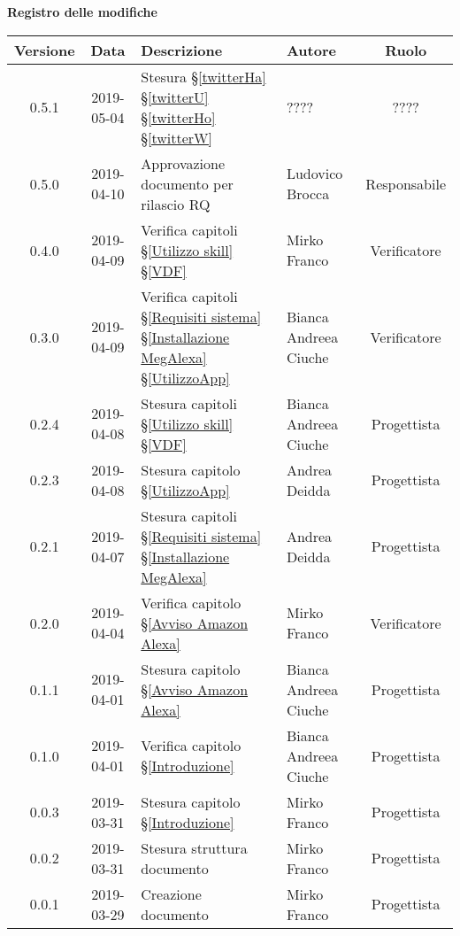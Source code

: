 	\begin{center}
		\textbf{Registro delle modifiche}
	\end{center}
	\begin{center}
		\begin{tabularx}{\textwidth}{|c|c|X|X|c|}
			\hline
			\textbf{Versione} & \textbf{Data} & \textbf{Descrizione} & \textbf{Autore} & \textbf{Ruolo} \\
			\hline
			0.5.1 & 2019-05-04& Stesura \S\ref{twitterHa} \S\ref{twitterU} \S\ref{twitterHo} \S\ref{twitterW} & ???? & ???? \\
			\hline
			0.5.0 & 2019-04-10& Approvazione documento per rilascio RQ & Ludovico Brocca & Responsabile \\
			\hline
			0.4.0 & 2019-04-09& Verifica capitoli \S\ref{Utilizzo skill}  \S\ref{VDF}  & Mirko Franco & Verificatore \\
			\hline
			0.3.0 & 2019-04-09 & Verifica capitoli \S\ref{Requisiti sistema}  \S\ref{Installazione MegAlexa}  \S\ref{UtilizzoApp}  & Bianca Andreea Ciuche & Verificatore \\
			\hline
			0.2.4 & 2019-04-08 & Stesura capitoli \S\ref{Utilizzo skill}  \S\ref{VDF}  & Bianca Andreea Ciuche & Progettista \\
			\hline
			0.2.3 & 2019-04-08 & Stesura capitolo \S\ref{UtilizzoApp} & Andrea Deidda & Progettista \\
			\hline
			0.2.1 & 2019-04-07 & Stesura capitoli \S\ref{Requisiti sistema}  \S\ref{Installazione MegAlexa}  & Andrea Deidda & Progettista \\
			\hline
			0.2.0 & 2019-04-04 &Verifica capitolo \S\ref{Avviso Amazon Alexa} & Mirko Franco  & Verificatore\\
			\hline
			0.1.1 & 2019-04-01 &Stesura capitolo \S\ref{Avviso Amazon Alexa} & Bianca Andreea Ciuche & Progettista \\
			\hline
			0.1.0 & 2019-04-01 & Verifica capitolo \S\ref{Introduzione} & Bianca Andreea Ciuche & Progettista \\
			\hline
			0.0.3 & 2019-03-31 & Stesura capitolo \S\ref{Introduzione} & Mirko Franco &  Progettista\\
			\hline
			0.0.2 & 2019-03-31 & Stesura struttura documento & Mirko Franco &  Progettista\\
			\hline
			0.0.1 & 2019-03-29 & Creazione documento & Mirko Franco & Progettista\\
			\hline
		\end{tabularx}
	\end{center}
\newpage